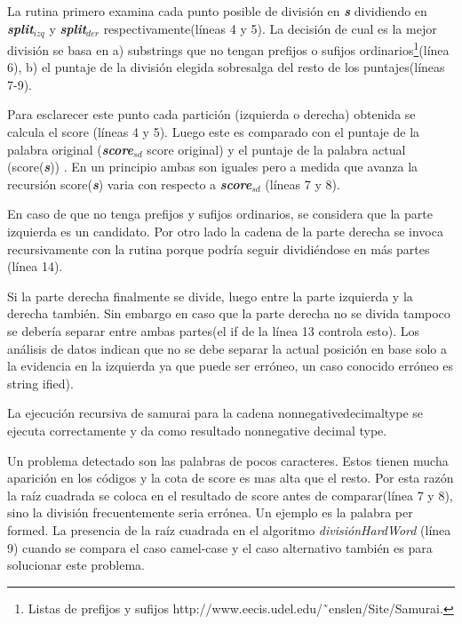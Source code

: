 \documentclass[a4paper,12pt]{report}
\begin{document}
La rutina primero examina cada punto posible de división en \textbf{\textit{s}} dividiendo en \textbf{\textit{split$_{izq}$}} y \textbf{\textit{split$_{der}$}} respectivamente(líneas 4 y 5). La decisión de cual es la mejor división se basa en a) substrings que no tengan prefijos o sufijos ordinarios\footnote[1]{Listas de prefijos y sufijos  http://www.eecis.udel.edu/˜enslen/Site/Samurai.}(línea 6), b) el puntaje de la división elegida sobresalga del resto de los puntajes(líneas 7-9). 

Para esclarecer este punto cada partición (izquierda o derecha) obtenida se calcula el score (líneas 4 y 5). Luego este es comparado con el puntaje de la palabra original (\textbf{\textit{score$_{sd}$}} score original) y el puntaje de la palabra actual (score(\textbf{\textit{s}})) . En un principio ambas son iguales pero a medida que avanza la recursión score(\textbf{\textit{s}}) varia con respecto a \textbf{\textit{score$_{sd}$}} (líneas 7 y 8).

En caso de que no tenga prefijos y sufijos ordinarios, se considera que la parte izquierda es un candidato. Por otro lado la cadena de la parte derecha se invoca recursivamente con la rutina porque podría seguir dividiéndose en más partes (línea 14).

Si la parte derecha finalmente se divide, luego entre la parte izquierda y la derecha también. Sin embargo en caso que la parte derecha no se divida tampoco se debería separar entre ambas partes(el \textsf{if} de la línea 13 controla esto). Los análisis de datos\cite{EHPV09} indican que no se debe separar la actual posición en base solo a la evidencia en la izquierda ya que puede ser erróneo, un caso conocido erróneo es \textsf{string ified}). 

La ejecución recursiva de samurai para la cadena \textsf{nonnegativedecimaltype} se ejecuta correctamente y da como resultado \textsf{nonnegative decimal type}\cite{EHPV09}.

Un problema detectado son las palabras de pocos caracteres. Estos tienen mucha aparición en los códigos y la cota de score es mas alta que el resto. Por esta razón la raíz cuadrada se coloca en el resultado de score antes de comparar(línea 7 y 8), sino la división frecuentemente seria errónea. Un ejemplo es la palabra \textsf{per formed}. La presencia de la raíz cuadrada en el algoritmo \textit{divisiónHardWord} (línea 9) cuando se compara el caso camel-case y el caso alternativo también es para solucionar este problema.\\
\end{document}
